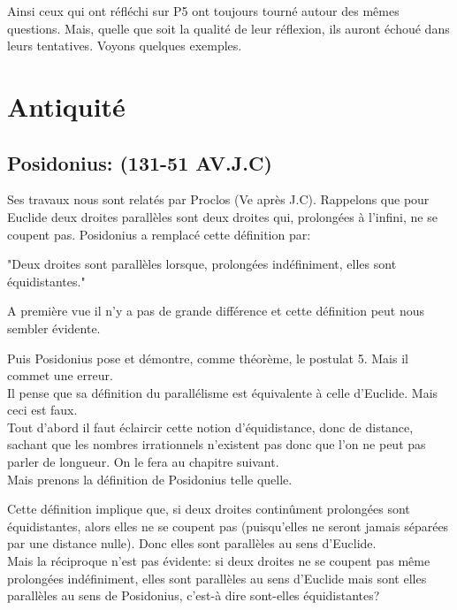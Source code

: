 \documentclass[a4paper, 12pt, twoside]{book}
\begin{document}
  Ainsi ceux qui ont réfléchi sur P5 ont toujours tourné autour des mêmes questions. Mais, quelle que soit la qualité de leur réflexion, ils auront échoué dans leurs tentatives. Voyons quelques exemples.\
  
 
  
   \section{Antiquité}
  \subsection{ Posidonius: (131-51 AV.J.C)}\bigskip 
  
   Ses travaux nous sont relatés par Proclos (Ve après J.C). Rappelons que pour Euclide deux droites parallèles sont deux droites qui, prolongées à l'infini, ne se coupent pas. Posidonius a remplacé cette définition par:\bigskip
   
   "Deux droites sont parallèles lorsque, prolongées indéfiniment, elles sont équidistantes."\bigskip
   
   A première vue il n'y a pas de grande différence et cette définition peut nous sembler évidente.
   
    Puis Posidonius pose et démontre, comme théorème, le postulat 5. Mais il commet une erreur.\\
    
    
  Il pense que sa définition du parallélisme est équivalente à celle d'Euclide. Mais ceci est faux.\\
  
  Tout d'abord il faut éclaircir cette notion d'équidistance, donc de distance, sachant que les nombres irrationnels n'existent pas donc que l'on ne peut pas parler de longueur. On le fera au chapitre suivant.\\
  
  Mais prenons la définition de Posidonius telle quelle.\ 
  
  
  Cette définition  implique que, si deux droites  continûment prolongées sont équidistantes, alors elles ne se coupent pas (puisqu'elles ne seront jamais séparées par une distance nulle). Donc elles sont parallèles au sens d'Euclide.\\
  
  
  Mais la réciproque n'est pas évidente: si deux droites ne se coupent pas même prolongées indéfiniment, elles sont parallèles au sens d'Euclide mais sont elles parallèles au sens de Posidonius, c'est-à dire sont-elles équidistantes?
  
\end{document}
